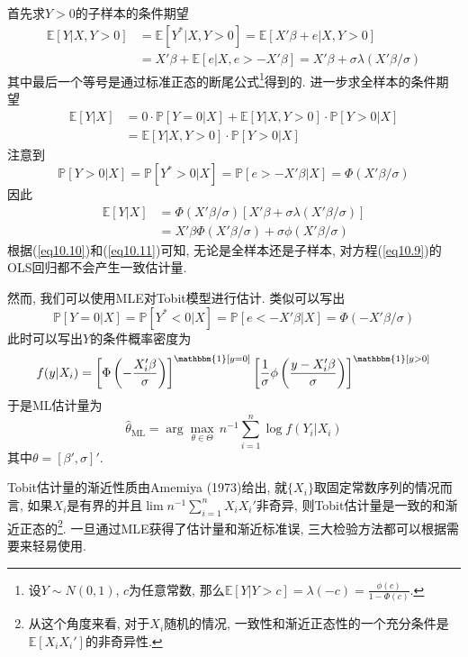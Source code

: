 \documentclass[cn, 12pt, math=mtpro2, bibstyle=apa, blue, twocol]{elegantbook}
\newcommand{\E}{\mathbb{E}}
\newcommand{\PP}{\mathbb{P}}
\begin{document}
首先求$Y>0$的子样本的条件期望
\begin{align}
\E[Y|X,Y>0]&=\E[Y^\ast|X,Y>0]=\E[X'\beta+e|X,Y>0]\nonumber \\
&=X'\beta+\E[e|X,e>-X'\beta]=X'\beta+\sigma\lambda(X'\beta/\sigma) \label{eq10.10}
\end{align}
其中最后一个等号是通过标准正态的断尾公式\footnote{设$Y\sim N(0,1)$, $c$为任意常数, 那么$\E[Y|Y>c]=\lambda(-c)=\displaystyle\frac{\phi(c)}{1-\Phi(c)}$.}得到的. 进一步求全样本的条件期望
\begin{align*}
\E[Y|X]&=0\cdot \PP[Y=0|X]+\E[Y|X,Y>0]\cdot\PP[Y>0|X] \\
&=\E[Y|X,Y>0]\cdot\PP[Y>0|X]
\end{align*}
注意到
\begin{equation}
\PP[Y>0|X]=\PP[Y^\ast>0|X]=\PP[e>-X'\beta|X]=\Phi(X'\beta/\sigma) \label{eq10.15}
\end{equation}
因此
\begin{align}
  \E[Y|X]&=\Phi(X'\beta/\sigma)[X'\beta+\sigma\lambda(X'\beta/\sigma)] \nonumber \\
  &=X'\beta\Phi(X'\beta/\sigma)+\sigma\phi(X'\beta/\sigma) \label{eq10.11}
\end{align}
根据(\ref{eq10.10})和(\ref{eq10.11})可知, 无论是全样本还是子样本, 对方程(\ref{eq10.9})的OLS回归都不会产生一致估计量.

然而, 我们可以使用MLE对Tobit模型进行估计. 类似可以写出
\begin{equation}\label{eq10.12}
  \PP[Y=0|X]=\PP[Y^\ast<0|X]=\PP[e<-X'\beta|X]=\Phi(-X'\beta/\sigma)
\end{equation}
此时可以写出$Y$的条件概率密度为
$$f(y|X_i)=\left[\Phi\left(-\frac{X_i'\beta}{\sigma}\right)\right]^{\mathbbm{1}[y=0]}\left[\frac{1}{\sigma}\phi\left(\frac{y-X_i'\beta}{\sigma}\right)\right]^{\mathbbm{1}[y>0]}$$
于是ML估计量为
$$\hat{\theta}_\text{ML}=\arg\max_{\theta\in\Theta}\,n^{-1}\sum_{i=1}^{n}\log f(Y_i|X_i)$$
其中$\theta=[\beta',\sigma]'$.

Tobit估计量的渐近性质由Amemiya (1973)给出, 就$\{X_i\}$取固定常数序列的情况而言, 如果$X_i$是有界的并且$\lim n^{-1}\sum_{i=1}^{n}X_iX_i'$非奇异, 则Tobit估计量是一致的和渐近正态的\footnote{从这个角度来看, 对于$X_i$随机的情况, 一致性和渐近正态性的一个充分条件是$\E[X_iX_i']$的非奇异性.}. 一旦通过MLE获得了估计量和渐近标准误, 三大检验方法都可以根据需要来轻易使用.
\end{document}
